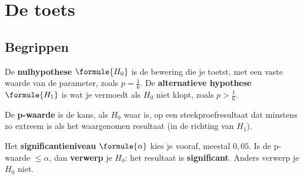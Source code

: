 
\begin{oefeningen}

\end{oefeningen}

\section{De toets}

\subsection{Begrippen}

\begin{theorie}
De \textbf{\textcolor{accent}{nulhypothese}} $\formule{H_0}$ is de bewering die je toetst, met een vaste waarde van de parameter, zoals $p = \frac16$. De \textbf{\textcolor{accent}{alternatieve hypothese}} $\formule{H_1}$ is wat je vermoedt als $H_0$ niet klopt, zoals $p > \frac16$.

\vspace{1mm}
De \textbf{\textcolor{accent}{p-waarde}} is de kans, als $H_0$ waar is, op een steekproefresultaat dat minstens zo extreem is als het waargenomen resultaat (in de richting van $H_1$).

\vspace{1mm}
Het \textbf{\textcolor{accent}{significantieniveau}} $\formule{\alpha}$ kies je vooraf, meestal $0{,}05$. Is de p-waarde $\leqslant \alpha$, dan \textbf{\textcolor{accent}{verwerp}} je $H_0$: het resultaat is \textbf{\textcolor{accent}{significant}}. Anders verwerp je $H_0$ niet.
\end{theorie}

